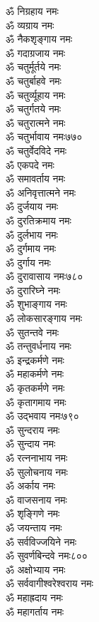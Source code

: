 \begin{multicols}{2}
\begin{flushleft}
ॐ निग्रहाय नमः\\
ॐ व्यग्राय नमः\\
ॐ नैकशृङ्गाय नमः\\
ॐ गदाग्रजाय नमः\\
ॐ चतुर्मूर्तये नमः\\
ॐ चतुर्बाहवे नमः\\
ॐ चतुर्व्यूहाय नमः\\
ॐ चतुर्गतये नमः\\
ॐ चतुरात्मने नमः\\
ॐ चतुर्भावाय नमः\hfill ७७०\\
ॐ चतुर्वेदविदे नमः\\
ॐ एकपदे नमः\\
ॐ समावर्ताय नमः\\
ॐ अनिवृत्तात्मने नमः\\
ॐ दुर्जयाय नमः\\
ॐ दुरतिक्रमाय नमः\\
ॐ दुर्लभाय नमः\\
ॐ दुर्गमाय नमः\\
ॐ दुर्गाय नमः\\
ॐ दुरावासाय नमः\hfill ७८०\\
ॐ दुरारिघ्ने नमः\\
ॐ शुभाङ्गाय नमः\\
ॐ लोकसारङ्गाय नमः\\
ॐ सुतन्तवे नमः\\
ॐ तन्तुवर्धनाय नमः\\
ॐ इन्द्रकर्मणे नमः\\
ॐ महाकर्मणे नमः\\
ॐ कृतकर्मणे नमः\\
ॐ कृतागमाय नमः\\
ॐ उद्भवाय नमः\hfill ७९०\\
ॐ सुन्दराय नमः\\
ॐ सुन्दाय नमः\\
ॐ रत्ननाभाय नमः\\
ॐ सुलोचनाय नमः\\
ॐ अर्काय नमः\\
ॐ वाजसनाय नमः\\
ॐ शृङ्गिणे नमः\\
ॐ जयन्ताय नमः\\
ॐ सर्वविज्जयिने नमः\\
ॐ सुवर्णबिन्दवे नमः\hfill ८००\\
ॐ अक्षोभ्याय नमः\\
ॐ सर्ववागीश्वरेश्वराय नमः\\
ॐ महाह्रदाय नमः\\
ॐ महागर्ताय नमः\\

\end{flushleft}
\end{multicols}
